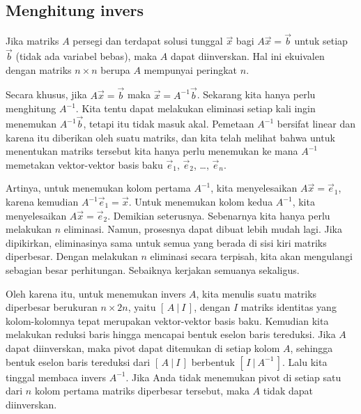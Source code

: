 \subsection{Menghitung invers}

Jika matriks $A$ persegi dan terdapat solusi tunggal
$\vec{x}$ bagi $A \vec{x} = \vec{b}$ untuk setiap $\vec{b}$ (tidak ada variabel
bebas), maka $A$ dapat diinverskan.
Hal ini ekuivalen dengan matriks $n \times n$ berupa $A$ mempunyai peringkat $n$.

Secara khusus, jika $A \vec{x} = \vec{b}$ maka $\vec{x} = A^{-1} \vec{b}$.
Sekarang kita hanya perlu menghitung $A^{-1}$. Kita tentu dapat
melakukan eliminasi setiap kali ingin menemukan $A^{-1} \vec{b}$, tetapi itu
tidak masuk akal. Pemetaan $A^{-1}$ bersifat linear dan
karena itu diberikan oleh suatu matriks, dan kita telah melihat bahwa untuk menentukan matriks tersebut
kita hanya perlu menemukan ke mana $A^{-1}$ memetakan vektor-vektor basis baku
$\vec{e}_1$,
$\vec{e}_2$, \ldots,
$\vec{e}_n$.

Artinya, untuk menemukan kolom pertama $A^{-1}$, kita menyelesaikan
$A \vec{x} = \vec{e}_1$, karena kemudian $A^{-1} \vec{e}_1 = \vec{x}$.
Untuk menemukan kolom kedua $A^{-1}$, kita menyelesaikan
$A \vec{x} = \vec{e}_2$. Demikian seterusnya. Sebenarnya kita hanya perlu melakukan $n$
eliminasi. Namun, prosesnya dapat dibuat lebih mudah lagi.
Jika dipikirkan, eliminasinya sama untuk
semua yang berada di sisi kiri matriks diperbesar. Dengan melakukan
$n$ eliminasi secara terpisah, kita akan mengulangi sebagian besar perhitungan.
Sebaiknya kerjakan semuanya sekaligus.

Oleh karena itu, untuk menemukan invers $A$, kita menulis suatu matriks diperbesar berukuran $n
\times 2n$, yaitu $[ \,A ~|~ I\, ]$, dengan $I$ matriks identitas
yang kolom-kolomnya tepat merupakan vektor-vektor basis baku.
Kemudian kita melakukan reduksi baris hingga mencapai bentuk eselon baris
tereduksi. Jika $A$ dapat diinverskan, maka pivot dapat ditemukan di setiap kolom $A$,
sehingga
bentuk eselon baris tereduksi dari $[ \,A ~|~ I\, ]$
berbentuk $[ \,I ~|~ A^{-1}\, ]$.
Lalu kita tinggal membaca invers $A^{-1}$.
Jika Anda tidak menemukan pivot di setiap
satu dari $n$ kolom pertama matriks diperbesar tersebut, maka
$A$ tidak dapat diinverskan.

